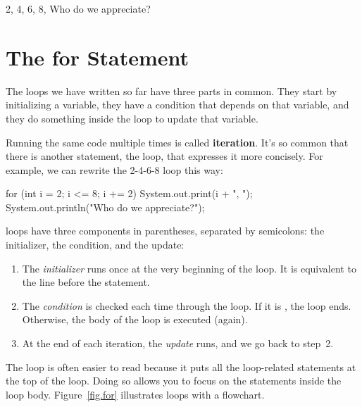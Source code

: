 \begin{stdout}
2, 4, 6, 8, Who do we appreciate?
\end{stdout}


\section{The for Statement}


The loops we have written so far have three parts in common.
They start by initializing a variable, they have a condition that depends on that variable, and they do something inside the loop to update that variable.


Running the same code multiple times is called {\bf iteration}.
It's so common that there is another statement, the  loop, that expresses it more concisely.
For example, we can rewrite the 2-4-6-8 loop this way:

\begin{code}
for (int i = 2; i <= 8; i += 2) {
    System.out.print(i + ", ");
}
System.out.println("Who do we appreciate?");
\end{code}

 loops have three components in parentheses, separated by semicolons: the initializer, the condition, and the update:

\begin{enumerate}

\item The {\em initializer} runs once at the very beginning of the loop.
It is equivalent to the line before the  statement.

\item The {\em condition} is checked each time through the loop.
If it is , the loop ends.
Otherwise, the body of the loop is executed (again).

\item At the end of each iteration, the {\em update} runs, and we go back to step~2.

\end{enumerate}

The  loop is often easier to read because it puts all the loop-related statements at the top of the loop.
Doing so allows you to focus on the statements inside the loop body.
Figure~\ref{fig.for} illustrates  loops with a flowchart.

